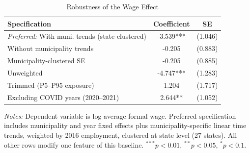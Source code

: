 \begin{table}[htbp]
\centering
\caption{Robustness of the Wage Effect}
\label{tab:robustness}
\begin{tabular}{lcc}
\hline\hline
Specification & Coefficient & SE \\
\hline
\textit{Preferred:} With muni. trends (state-clustered) & -3.539*** & (1.046) \\
Without municipality trends & -0.205 & (0.883) \\
Municipality-clustered SE & -0.205 & (0.885) \\
Unweighted & -4.747*** & (1.283) \\
Trimmed (P5--P95 exposure) & 1.204 & (1.717) \\
Excluding COVID years (2020--2021) & 2.644** & (1.052) \\
\hline\hline
\end{tabular}
\begin{tablenotes}
\item \textit{Notes:} Dependent variable is log average formal wage. Preferred specification includes municipality and year fixed effects plus municipality-specific linear time trends, weighted by 2016 employment, clustered at state level (27 states). All other rows modify one feature of this baseline. $^{***}p<0.01$, $^{**}p<0.05$, $^{*}p<0.1$.
\end{tablenotes}
\end{table}
